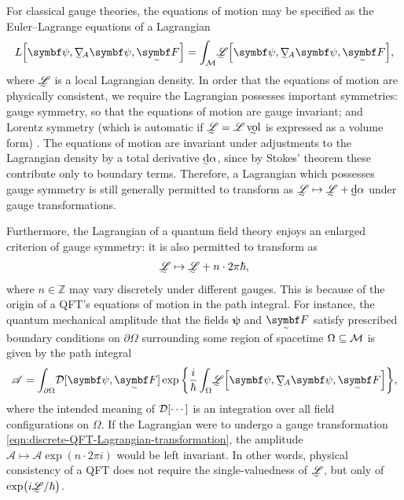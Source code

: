 For classical gauge theories, the equations of motion may be specified as the Euler--Lagrange equations of a Lagrangian
\begin{align}
	L\qty[\bm\psi, \ts\nabla_{\!A}\bm\psi, \tsbm F] = \int_{\cal M}\! \LL\qty[\bm\psi, \ts\nabla_{\!A}\bm\psi, \tsbm F]
,\end{align}
where $\LL$ is a local Lagrangian density.
In order that the equations of motion are physically consistent, we require the Lagrangian possesses important symmetries: gauge symmetry, so that the equations of motion are gauge invariant; and Lorentz symmetry (which is automatic if $\LL = \mathscr{L}\,\vol$ is expressed as a volume form) \cite[§\,7.1]{Hamilton_2017}.
The equations of motion are invariant under adjustments to the Lagrangian density by a total derivative $\ts\dd\alpha$, since by Stokes' theorem these contribute only to boundary terms.
Therefore, a Lagrangian which possesses gauge symmetry is still generally permitted to transform as
\begin{math}
	\LL \mapsto \LL + \ts\dd\alpha
\end{math}
under gauge transformations.

Furthermore, the Lagrangian of a quantum field theory enjoys an enlarged criterion of gauge symmetry: it is also permitted to transform as
\begin{align}
	\LL \mapsto \LL + n\cdot2\pi\hbar
	\label{eqn:discrete-QFT-Lagrangian-transformation}
,\end{align}
where $n \in \mathds Z$ may vary discretely under different gauges.
This is because of the origin of a QFT's equations of motion in the path integral.
For instance, the quantum mechanical amplitude that the fields $\bm\psi$ and $\tsbm F$ satisfy prescribed boundary conditions on $\partial\Omega$ surrounding some region of spacetime $\Omega \subseteq \cal M$ is given by the path integral
\begin{align}
	\mathscr A = \int_{\partial\Omega}\! \cal D[\bm\psi, \tsbm F] \exp\qty{\frac{i}{\hbar} \int_{\Omega}\! \LL\qty[\bm\psi, \ts\nabla_{\!A}\bm\psi, \tsbm F]}
,\end{align}
where the intended meaning of $\cal D[\cdots]$ is an integration over all field configurations on $\Omega$.
If the Lagrangian were to undergo a gauge transformation \eqref{eqn:discrete-QFT-Lagrangian-transformation}, the amplitude $\mathscr A \mapsto \mathscr A\exp(n\cdot2\pi i)$ would be left invariant.
In other words, physical consistency of a QFT does not require the single-valuedness of $\LL$, but only of $\exp(i\LL/\hbar)$.


